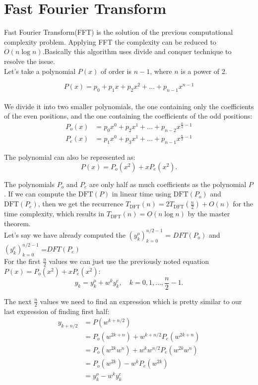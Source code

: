 \documentclass[28]{report}
\begin{document}
\section{Fast Fourier Transform}

Fast Fourier Transform(FFT) is the solution of the previous computational complexity problem. Applying FFT the complexity can be reduced to $O(n\log n)$.Basically this algorithm uses divide and conquer technique to resolve the issue.\\

Let's take a polynomial $P(x)$ of order is $n-1$, where $n$ is a power of 2.

 $$P(x) = p_0 + p_1x 
 + p_2x^2 + ... + p_{n-1}x^{n-1}$$\\
 
 We divide it into two smaller polynomials, the one containing only the coefficients of the even positions, and the one containing the coefficients of the odd positions:
  \begin{align*} P_o(x) &= p_0 x^0 + p_2 x^1 + \dots + p_{n-2} x^{\frac{n}{2}-1} \\ P_e(x) &= p_1 x^0 + p_3 x^1 + \dots + p_{n-1} x^{\frac{n}{2}-1} \end{align*}

  The polynomial can also be represented as:\\
  $$P(x) = P_o(x^2) + x P_e(x^2).$$

  
The polynomials $P_o$ and $P_e$ are only half as much coefficients as the polynomial $P$. If we can compute the $\text{DFT}(P)$ in linear time using $\text{DFT}(P_o)$ and $\text{DFT}(P_e)$, then we get the recurrence $T_{\text{DFT}}(n) = 2 T_{\text{DFT}}\left(\frac{n}{2}\right) + O(n)$ for the time complexity, which results in $T_{\text{DFT}}(n) = O(n \log n)$ by the master theorem.\\

Let's say we have already computed the $\left(y_k^o\right)_{k=0}^{n/2-1}$ = $DFT(P_o)$ and \\ $\left(y_k^e\right)_{k=0}^{n/2-1}$ =$DFT(P_e)$\\ 

For the first $\frac{n}{2}$ values we can just use the previously noted equation\\ $P(x) = P_o(x^2) + x P_e(x^2)$:
$$y_k = y_k^o + w^k y_k^e, \quad k = 0,1, \dots ,\frac{n}{2} - 1.$$

The next $\frac{n}{2}$ values we need to find an expression which is pretty similar to our last expression of finding first half:
\begin{align*} y_{k+n/2} &= P\left(w^{k+n/2}\right) \\ &= P_o\left(w^{2k+n}\right) + w^{k + n/2} P_e\left(w^{2k+n}\right) \\ &= P_o\left(w^{2k} w^n\right) + w^k w^{n/2} P_e\left(w^{2k} w^n\right) \\ &= P_o\left(w^{2k}\right) - w^k P_e\left(w^{2k}\right) \\ &= y_k^o - w^k y_k^e \end{align*}
\end{document}
